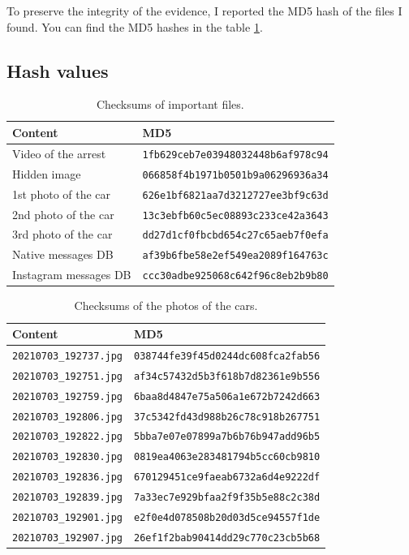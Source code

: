 \documentclass[12pt]{article}
\begin{document}
To preserve the integrity of the evidence, I reported the MD5 hash of the files I found. You can find the MD5 hashes in the table \ref{table:hashes}.

\subsection{Hash values}

\begin{table}[!ht]
    \centering
    \begin{tabular}{ll}
    \toprule
    \textbf{Content} & \textbf{MD5} \\
    \midrule
    Video of the arrest & \texttt{1fb629ceb7e03948032448b6af978c94} \\
    Hidden image & \texttt{066858f4b1971b0501b9a06296936a34} \\
    1st photo of the car & \texttt{626e1bf6821aa7d3212727ee3bf9c63d} \\
    2nd photo of the car & \texttt{13c3ebfb60c5ec08893c233ce42a3643} \\
    3rd photo of the car & \texttt{dd27d1cf0fbcbd654c27c65aeb7f0efa} \\
    Native messages DB & \texttt{af39b6fbe58e2ef549ea2089f164763c} \\
    Instagram messages DB & \texttt{ccc30adbe925068c642f96c8eb2b9b80} \\
    \bottomrule
    \end{tabular}
    \caption{Checksums of important files.}
    \label{table:hashes}
\end{table}

\begin{table}[!ht]
    \centering
    \begin{tabular}{ll}
    \toprule
    \textbf{Content} & \textbf{MD5} \\
    \midrule
    \texttt{20210703\_192737.jpg} & \texttt{038744fe39f45d0244dc608fca2fab56} \\
    \texttt{20210703\_192751.jpg} & \texttt{af34c57432d5b3f618b7d82361e9b556} \\
    \texttt{20210703\_192759.jpg} & \texttt{6baa8d4847e75a506a1e672b7242d663} \\
    \texttt{20210703\_192806.jpg} & \texttt{37c5342fd43d988b26c78c918b267751} \\
    \texttt{20210703\_192822.jpg} & \texttt{5bba7e07e07899a7b6b76b947add96b5} \\
    \texttt{20210703\_192830.jpg} & \texttt{0819ea4063e283481794b5cc60cb9810} \\
    \texttt{20210703\_192836.jpg} & \texttt{670129451ce9faeab6732a6d4e9222df} \\
    \texttt{20210703\_192839.jpg} & \texttt{7a33ec7e929bfaa2f9f35b5e88c2c38d} \\
    \texttt{20210703\_192901.jpg} & \texttt{e2f0e4d078508b20d03d5ce94557f1de} \\
    \texttt{20210703\_192907.jpg} & \texttt{26ef1f2bab90414dd29c770c23cb5b68} \\
    \bottomrule
    \end{tabular}
    \caption{Checksums of the photos of the cars.}
    \label{table:hashes-cars}
\end{table}
\end{document}
